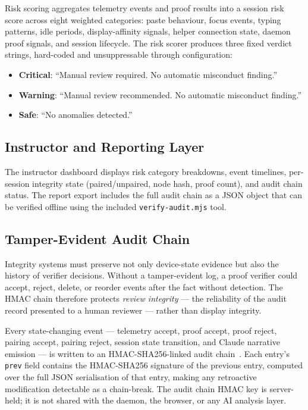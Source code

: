 \documentclass[conference]{IEEEtran}
\begin{document}
Risk scoring aggregates telemetry events and proof results into a session risk score across eight weighted categories: paste behaviour, focus events, typing patterns, idle periods, display-affinity signals, helper connection state, daemon proof signals, and session lifecycle. The risk scorer produces three fixed verdict strings, hard-coded and unsuppressable through configuration:
\begin{itemize}
\item \textbf{Critical}: ``Manual review required. No automatic misconduct finding.''
\item \textbf{Warning}: ``Manual review recommended. No automatic misconduct finding.''
\item \textbf{Safe}: ``No anomalies detected.''
\end{itemize}

\subsection{Instructor and Reporting Layer}

The instructor dashboard displays risk category breakdowns, event timelines, per-session integrity state (paired/unpaired, node hash, proof count), and audit chain status. The report export includes the full audit chain as a JSON object that can be verified offline using the included \texttt{verify-audit.mjs} tool.

\subsection{Tamper-Evident Audit Chain}

Integrity systems must preserve not only device-state evidence but also the history of verifier decisions. Without a tamper-evident log, a proof verifier could accept, reject, delete, or reorder events after the fact without detection. The HMAC chain therefore protects \textit{review integrity} — the reliability of the audit record presented to a human reviewer — rather than display integrity.

Every state-changing event — telemetry accept, proof accept, proof reject, pairing accept, pairing reject, session state transition, and Claude narrative emission — is written to an HMAC-SHA256-linked audit chain~\cite{rfc2104}. Each entry's \texttt{prev} field contains the HMAC-SHA256 signature of the previous entry, computed over the full JSON serialisation of that entry, making any retroactive modification detectable as a chain-break. The audit chain HMAC key is server-held; it is not shared with the daemon, the browser, or any AI analysis layer.
\end{document}
